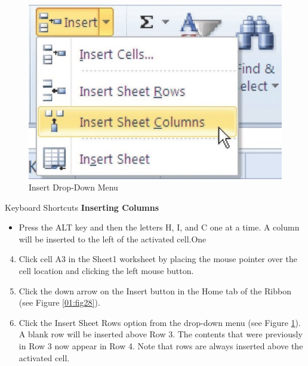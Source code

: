 \begin{figure}[H]
	\centering
	\includegraphics[width=\maxwidth{.95\linewidth}]{gfx/ch01_fig29}
	\caption{Insert Drop-Down Menu}
	\label{01:fig29}
\end{figure}

\begin{center}
	\begin{shtcutbox}{Keyboard Shortcuts}
		\textbf{Inserting Columns}
		\\
		\begin{itemize}
			\setlength{\itemsep}{0pt}
			\setlength{\parskip}{0pt}
			\setlength{\parsep}{0pt}
			
			\item Press the ALT key and then the letters H, I, and C one at a time. A column will be inserted to the left of the activated cell.One
			
		\end{itemize}
	\end{shtcutbox}
\end{center}

\begin{enumerate}
	\setcounter{enumi}{3}

	\item Click cell \textsf{A3} in the Sheet1 worksheet by placing the mouse pointer over the cell location and clicking the left mouse button.
	\item Click the down arrow on the Insert button in the Home tab of the Ribbon (see Figure \ref{01:fig28}).
	\item Click the Insert Sheet Rows option from the drop-down menu (see Figure \ref{01:fig29}). A blank row will be inserted above Row 3. The contents that were previously in Row 3 now appear in Row 4. Note that rows are always inserted above the activated cell.
\end{enumerate}

